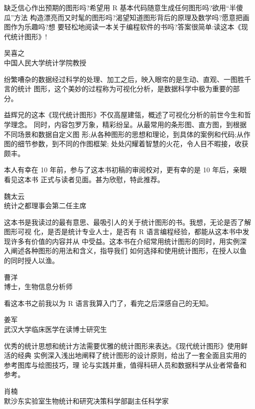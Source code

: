 \documentclass[
  b5paper,
  UTF8,twoside]{book}
\begin{document}
缺乏信心作出预期的图形吗?希望用 R 基本代码随意生成任何图形吗?欲用``半傻瓜''方法 构造漂亮而又时髦的图形吗?渴望知道图形背后的原理及数学吗?愿意把画图作为乐趣吗?想 要轻松地阅读一本关于编程软件的书吗?答案很简单:读这本《现代统计图形》!

\begin{flushright}
吴喜之\\
中国人民大学统计学院教授
\end{flushright}

纷繁嘈杂的数据经过科学的处理、加工之后，映入眼帘的是生动、直观、一图胜千言的统计
图形，这个美妙的过程称为可视化分析，是数据科学中极为重要的部分。

益辉兄的这本《现代统计图形》不仅高屋建瓴，概述了可视化分析的前世今生和哲学理念。 同时，内容包罗万象，精彩纷呈。从最常用的条形图、直方图，到根据不同场景和数据自定义图 形;从各种图形的思想和理论，到具体的案例和代码;从作图的细节参数，到不同的作图框架; 处处闪耀着智慧的火花，令人目不暇接，收获颇丰。

本人有幸在 10 年前，参与了这本书初稿的审阅校对，更有幸的是 10 年后，亲眼看见这本书 正式与读者见面。甚为欣慰，特此推荐。

\begin{flushright}
魏太云\\
统计之都理事会第二任主席
\end{flushright}

这本书是我读过的最有意思、最吸引人的关于统计图形的书。我想，无论是否了解图形可视 化，是否是统计专业人士，是否有 R 语言编程经验，都能从这本书中发现许多有价值的内容并从 中受益。这本书在介绍常用统计图形的同时，用实例深入阐述各种图形的用法和含义，指导我们 如何选择和使用统计图形，在授人以鱼的同时授人以渔。

\begin{flushright}
曹洋\\
博士，生物信息分析师
\end{flushright}

看这本书之前我以为 R 语言我算入门了，看完之后深感自己的无知。

\begin{flushright}
姜军\\
武汉大学临床医学在读博士研究生
\end{flushright}

优秀的统计思想和统计方法需要优雅的统计图形来表达。《现代统计图形》使用鲜活的经典 实例深入浅出地阐释了统计图形的设计原则，给出了一套全面且实用的参考图库与绘图技巧，理 论与实践并重，值得科研人员和数据科学从业者常备和参考。

\begin{flushright}
肖楠\\
默沙东实验室生物统计和研究决策科学部副主任科学家
\end{flushright}
\end{document}
